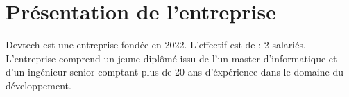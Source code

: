 \section{Présentation de l'entreprise}

Devtech est une entreprise fondée en 2022. L'effectif est de : 2 salariés. L'entreprise comprend un jeune diplômé issu de l'un master d'informatique et d'un ingénieur senior comptant plus de 20 ans d'éxpérience dans le domaine du développement.